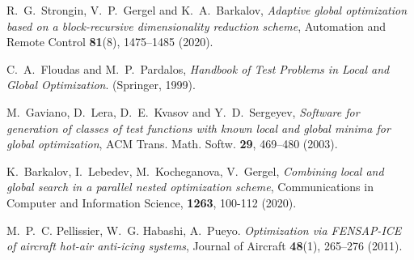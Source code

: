 \documentclass[
11pt,%
tightenlines,%
twoside,%
onecolumn,%
nofloats,%
nobibnotes,%
nofootinbib,%
superscriptaddress,%
noshowpacs,%
centertags]%
{revtex4}
\begin{document}
\begin{thebibliography}{99}
R.~G.~Strongin, V.~P.~Gergel and K.~A.~Barkalov, \textit{Adaptive global optimization based on a block-recursive dimensionality reduction scheme}, Automation and Remote Control \textbf{81}(8), 1475--1485 (2020).

C.~A.~Floudas and M.~P.~Pardalos,  \textit{Handbook of Test Problems in Local and Global Optimization}. (Springer, 1999).  %

M.~Gaviano, D.~Lera, D.~E.~Kvasov and Y.~D.~Sergeyev, \textit{Software for generation of classes of test functions with known local and global minima for global optimization}, ACM Trans. Math. Softw. \textbf{29}, 469--480 (2003).

K.~Barkalov, I.~Lebedev, M.~Kocheganova, V.~Gergel, \textit{Combining local and global search in a parallel nested optimization scheme}, Communications in Computer and Information Science, \textbf{1263}, 100-112 (2020).

M.~P.~C. Pellissier, W.~G. Habashi, A.~Pueyo. \textit{Optimization via FENSAP-ICE of aircraft hot-air anti-icing systems}, Journal of Aircraft \textbf{48}(1), 265--276 (2011). 






\end{thebibliography}
\end{document}
